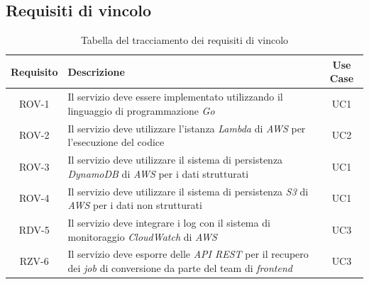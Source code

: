 \subsection{Requisiti di vincolo}
\begin{table}[H]
    \caption{Tabella del tracciamento dei requisiti di vincolo}
    \label{tab:requisiti-vincolo}
    \begin{tabularx}{\textwidth}{|c|X|c|}
        \hline
        \textbf{Requisito}                                               & \textbf{Descrizione}                                & \textbf{Use Case} \\
        \hline
        ROV-1                                                            & Il servizio deve essere implementato utilizzando il
        linguaggio di programmazione \emph{Go}                           & UC1                                                                     \\
        \hline
        ROV-2                                                            & Il servizio deve utilizzare l'istanza
        \emph{Lambda} di \emph{AWS} per
        l'esecuzione del codice                                          & UC2                                                                     \\
        \hline
        ROV-3                                                            & Il servizio deve utilizzare il sistema di
        persistenza \emph{DynamoDB} di \emph{AWS} per i dati strutturati & UC1
        \\
        \hline
        ROV-4                                                            & Il servizio deve utilizzare il sistema di
        persistenza \emph{S3} di \emph{AWS} per i dati non strutturati   & UC1
        \\
        \hline
        RDV-5                                                            & Il
        servizio deve integrare i log con il sistema di monitoraggio
        \emph{CloudWatch} di \emph{AWS}                                  & UC3
        \\
        \hline
        RZV-6                                                            & Il
        servizio deve esporre delle \emph{API REST} per il recupero dei
        \emph{job} di conversione da parte del team di \emph{frontend}   & UC3                                                                     \\
        \hline
    \end{tabularx}
\end{table}%
